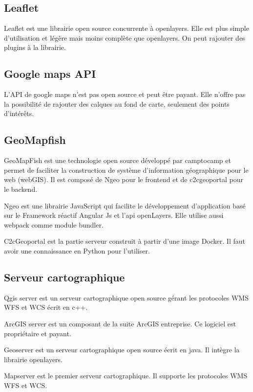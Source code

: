 \documentclass[
    iai, %
    il, %
]{heig-tb}
\begin{document}
\subsection{Leaflet}

Leaflet \cite{leaflet} est une librairie open source concurrente à openlayers.
Elle est plus simple d'utilisation et légère mais moins complète que openlayers.
On peut rajouter des plugins à la librairie.

\subsection{Google maps API}
L'API de google maps \cite{google-maps} n'est pas open source et peut être payant.
Elle n'offre pas la possibilité de rajouter des calques au fond de carte, seulement des points d'intérêts.

\subsection{GeoMapfish}
GeoMapFish est une technologie open source développé par camptocamp et permet de faciliter la construction de système d'information géographique pour le web (webGIS).
Il est composé de Ngeo pour le frontend \cite{ngeo} et de c2cgeoportal \cite{c2cgeoportal} pour le backend.

Ngeo est une librairie JavaScript qui facilite le développement d'application basé sur le Framework réactif Angular Js et l'api openLayers.
Elle utilise aussi webpack comme module bundler.

C2cGeoportal est la partie serveur construit à partir d'une image Docker. Il faut avoir une connaissance en Python pour l'utiliser.

\subsection{Serveur cartographique}
Qgis server \cite{qgis} est un serveur cartographique open source gérant les protocoles WMS WFS et WCS écrit en c++.

ArcGIS server \cite{arcgis} est un composant de la suite ArcGIS entreprise. Ce logiciel est propriétaire et payant.

Geoserver \cite{geoserver} est un serveur cartographique open source écrit en java. Il intègre la librairie openlayers.

Mapserver \cite{mapserver} est le premier serveur cartographique. Il supporte les protocoles WMS WFS et WCS.
\end{document}

